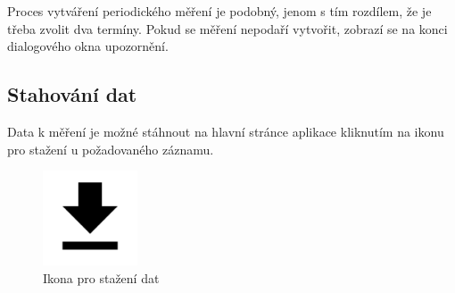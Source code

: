 \documentclass[12pt]{article}
\begin{document}
\begin{teamwork}
        Proces vytváření periodického měření je podobný, jenom s tím rozdílem, že je třeba zvolit dva termíny.
        Pokud se měření nepodaří vytvořit, zobrazí se na konci dialogového okna upozornění.



        \subsection{Stahování dat}\label{subsec:stahovani-dat}

        Data k měření je možné stáhnout na hlavní stránce aplikace kliknutím na ikonu pro stažení u požadovaného záznamu.

        \begin{figure}[hbt!]
            \centering
            \includegraphics[width=0.25\textwidth]{../../img/download_icon}
            \caption{Ikona pro stažení dat}
            \label{fig:dowload_icon}
        \end{figure}

    \end{teamwork}
\end{document}
